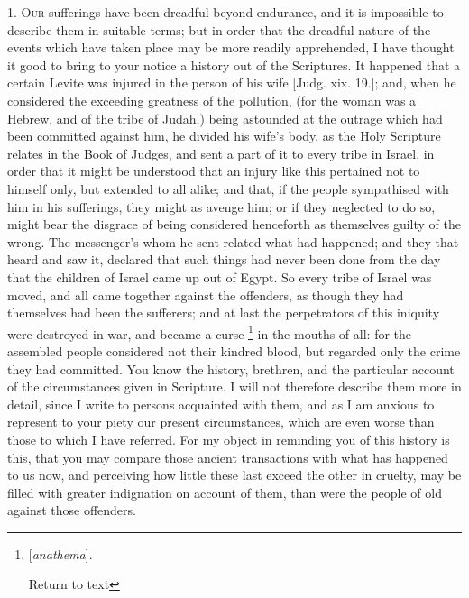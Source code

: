 1. O\textsc{ur} sufferings have been
dreadful beyond endurance, and it is impossible to describe them in
suitable terms; but in order that the dreadful nature of the
events which have taken place may be more readily apprehended, I have
thought it good to bring to your notice a history out of the
Scriptures. It happened that a certain Levite was injured in the
person of his wife [Judg. xix. 19.]; and, when he considered the
exceeding greatness of the pollution, (for the woman was a Hebrew, and
of the tribe of Judah,) being astounded at the outrage which had been
committed against him, he divided his wife's body, as the Holy
Scripture relates in the Book of Judges, and sent a part of it to
every tribe in Israel, in order that it might be understood that an
injury like this pertained not to himself only, but extended to all
alike; and that, if the people sympathised with him in his sufferings,
they might as avenge him; or if they neglected to do so, might bear
the disgrace of being considered henceforth as themselves guilty of
the wrong. The messenger's whom he sent related what had happened; and
they that heard and saw it, declared that such things had never been
done from the day that the children of Israel came up out of Egypt. So
every tribe of Israel was moved, and all came together against the
offenders, as though they had themselves had been the sufferers; and
at last the perpetrators of this iniquity were destroyed in war, and
became a curse \footnote{[\emph{anathema}].

Return to text} in the
mouths of all: for the assembled people considered not their kindred
blood, but regarded only the crime they had committed. You know the
history, brethren, and the particular account of the circumstances
given in Scripture. I will not therefore describe them more in detail,
since I write to persons acquainted with them, and as I am anxious to
represent to your piety our present circumstances, which are even
worse than those to which I have referred. For my object in reminding
you of this history is this, that you may compare those ancient
transactions with what has happened to us now, and perceiving how
little these last exceed the other in cruelty, may be filled with
greater indignation on account of them, than were the people of old
against those offenders.

